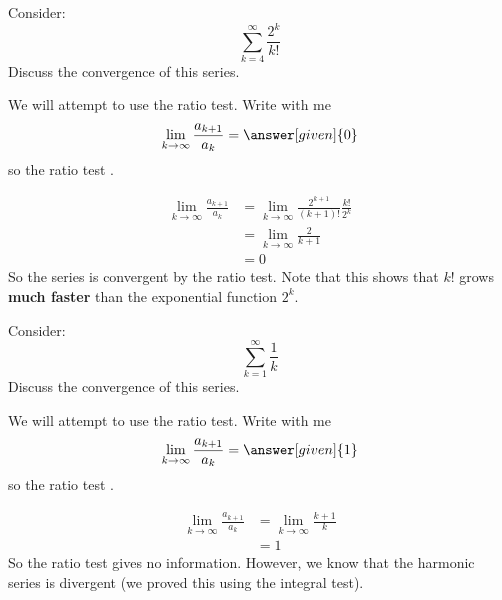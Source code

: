 \documentclass{ximera}
\begin{document}
\begin{example}
  Consider:
  \[
  \sum_{k=4}^\infty \frac{2^k}{k!}
  \]
  Discuss the convergence of this series.
  \begin{explanation}
    We will attempt to use the ratio test. Write with me
    \[
    \lim_{k \to \infty} \frac{a_{k+1}}{a_k} = \answer[given]{0}
    \]
    so the ratio test
	 .	
	 \begin{hint}
	   \begin{align*}
	     \lim_{k \to \infty} \frac{a_{k+1}}{a_k} &= \lim_{k \to \infty} \frac{2^{k+1}}{(k+1)!} \frac{k!}{2^k}\\
	     &=\lim_{k \to \infty} \frac{2}{k+1}\\
	     &=0
	   \end{align*}
	   So the series is convergent by the ratio test.  Note that
           this shows that $k!$ grows \textbf{much faster} than the
           exponential function $2^k$.
	 \end{hint}
  \end{explanation}
\end{example}



\begin{example}
  Consider: 
  \[
  \sum_{k=1}^\infty \frac{1}{k}
  \]
  Discuss the convergence of this series.
  \begin{explanation}
    We will attempt to use the ratio test. Write with me
    \[
    \lim_{k \to \infty} \frac{a_{k+1}}{a_k} = \answer[given]{1}
    \]
    so the ratio test
	 .
	 \begin{hint}
	   \begin{align*}
	     \lim_{k \to \infty} \frac{a_{k+1}}{a_k} &= \lim_{k \to \infty} \frac{k+1}{k}\\
	     &=1
	   \end{align*}
	   So the ratio test gives no information.
	   However, we know that the harmonic series is divergent (we proved this using the integral test).
	 \end{hint}
  \end{explanation}
\end{example}
\end{document}
